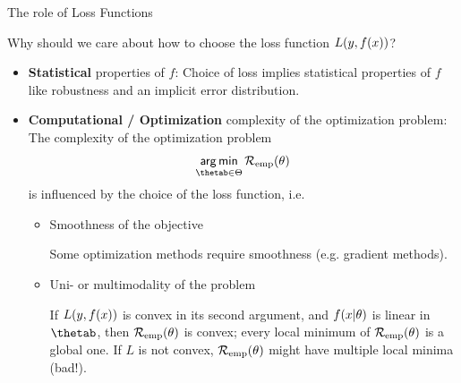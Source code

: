 \begin{vbframe}{The role of Loss Functions}

Why should we care about how to choose the loss function $L(y, f(x))$?

\begin{itemize}
\item \textbf{Statistical} properties of $f$: Choice of loss implies statistical properties of $f$ like robustness and an implicit error distribution.
\item \textbf{Computational / Optimization} complexity of the optimization problem: The complexity of the optimization problem
$$
\argmin_{\thetab \in \Theta} \risket
$$
is influenced by the choice of the loss function, i.e.\

  \begin{itemize}
    \item Smoothness of the objective \\
    \begin{footnotesize} 
    Some optimization methods require smoothness (e.g. gradient methods).
    \end{footnotesize}
    \item Uni- or multimodality of the problem \\
    \begin{footnotesize} 
    If $L(y, f(x))$ is convex in its second argument, and $f(x | \theta)$ is linear in $\thetab$, then $\mathcal{R}_{\text{emp}}(\theta)$ is convex; every local minimum of $\mathcal{R}_{\text{emp}}(\theta)$ is a global one. If $L$ is not convex, $\mathcal{R}_{\text{emp}}(\theta)$ might have multiple local minima (bad!).
    \end{footnotesize}
  \end{itemize}
\end{itemize}


\end{vbframe}

\endlecture

